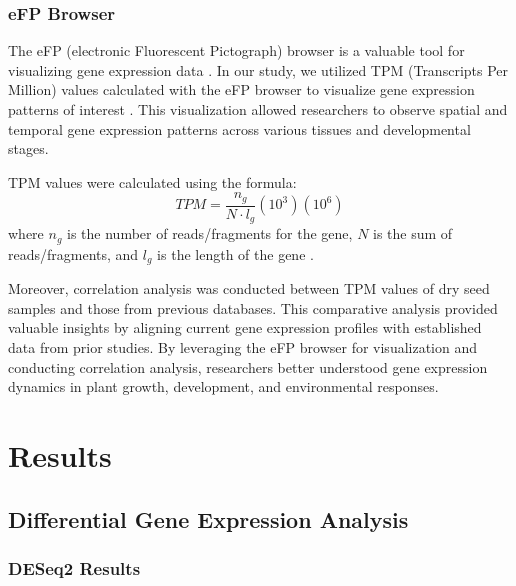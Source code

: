 \documentclass[12pt,letterpaper]{article}
\begin{document}
\subsubsection{eFP Browser}
The eFP (electronic Fluorescent Pictograph) browser is a valuable tool for visualizing gene expression data \parencite{winter2007electronic}. In our study, we utilized TPM (Transcripts Per Million) values calculated with the eFP browser to visualize gene expression patterns of interest \parencite{wagner2012tpm}. This visualization allowed researchers to observe spatial and temporal gene expression patterns across various tissues and developmental stages.

TPM values were calculated using the formula:
\[TPM=\frac{n_{g}}{N\cdot l_{g}}(10^3)(10^6)\] where $n_{g}$ is the number of reads/fragments for the gene, $N$ is the sum of reads/fragments, and $l_{g}$ is the length of the gene \parencite{wagner2012tpm}.

Moreover, correlation analysis was conducted between TPM values of dry seed samples and those from previous databases. This comparative analysis provided valuable insights by aligning current gene expression profiles with established data from prior studies. By leveraging the eFP browser for visualization and conducting correlation analysis, researchers better understood gene expression dynamics in plant growth, development, and environmental responses.

\section{Results}

\subsection{Differential Gene Expression Analysis}

\subsubsection{DESeq2 Results} 
\end{document}
